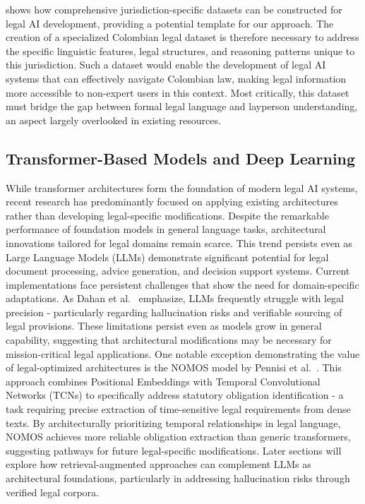 shows how comprehensive jurisdiction-specific datasets can be constructed for 
legal AI development, providing a potential template for our approach.
The creation of a specialized Colombian legal dataset is therefore necessary 
to address the specific linguistic features, legal structures, and reasoning 
patterns unique to this jurisdiction. Such a dataset would enable the development 
of legal AI systems that can effectively navigate Colombian law, making legal 
information more accessible to non-expert users in this context. Most critically, 
this dataset must bridge the gap between formal legal language and layperson 
understanding, an aspect largely overlooked in existing resources.

\subsection{Transformer-Based Models and Deep Learning}
While transformer architectures form the foundation of modern legal AI systems, 
recent research has predominantly focused on applying existing architectures rather 
than developing legal-specific modifications. Despite the remarkable performance of 
foundation models in general language tasks, architectural innovations tailored for 
legal domains remain scarce. This trend persists even as Large Language Models (LLMs) 
demonstrate significant potential for legal document processing, advice generation, and 
decision support systems.
Current implementations face persistent challenges that show the need for 
domain-specific adaptations. As Dahan et al.~\cite{dahan2023lawyers} emphasize, 
LLMs frequently struggle with legal precision - particularly regarding hallucination 
risks and verifiable sourcing of legal provisions. These limitations persist even as models 
grow in general capability, suggesting that architectural modifications may be necessary 
for mission-critical legal applications.
One notable exception demonstrating the value of legal-optimized architectures is the
NOMOS model by Pennisi et al.~\cite{pennisi-etal-2023-nomos}. This approach combines 
Positional Embeddings with Temporal Convolutional Networks (TCNs) to specifically address 
statutory obligation identification - a task requiring precise extraction of time-sensitive 
legal requirements from dense texts. By architecturally prioritizing temporal relationships 
in legal language, NOMOS achieves more reliable obligation extraction than generic transformers, 
suggesting pathways for future legal-specific modifications.
Later sections will explore how retrieval-augmented approaches can complement LLMs as architectural 
foundations, particularly in addressing hallucination risks through verified legal corpora.

